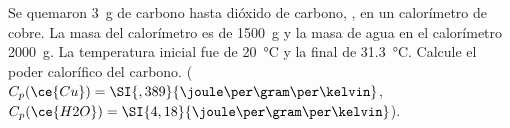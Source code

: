 Se quemaron \SI{3}{\gram} de carbono hasta dióxido de carbono, , en un calorímetro de cobre. La masa del calorímetro es de \SI{1500}{\gram} y la masa de agua en el calorímetro \SI{2000}{\gram}. La temperatura inicial fue de \SI{20}{\celsius} y la final de \SI{31,3}{\celsius}. Calcule el poder calorífico del carbono. ($C_p(\ce{Cu})=\SI{,389}{\joule\per\gram\per\kelvin}$, $C_p(\ce{H2O})=\SI{4,18}{\joule\per\gram\per\kelvin}$).
